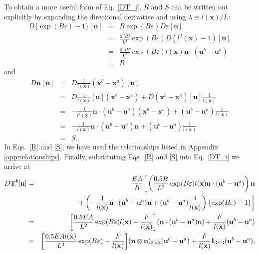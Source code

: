 \documentclass[12pt,aps,pre]{revtex4}
\begin{document}
To obtain a more useful form of Eq.\ \eqref{DT_i}, $R$ and $S$ can be written out explicitly by expanding the directional derivative and using $\lambda \equiv l(\textbf{x})/L$:
%
\begin{eqnarray}
D \{ \exp(B \varepsilon) - 1\} [\textbf{u}] &=& B \exp(B \varepsilon) D \varepsilon [\textbf{u}] \nonumber\\
&=& \frac{0.5B}{L^2} \exp(B \varepsilon)  D( l^2(\textbf{x}) - 1) [\textbf{u}] \nonumber\\
&=&  \frac{0.5B}{L^2}\exp(B \varepsilon)   l(\textbf{x})\textbf{n} \cdot (\textbf{u}^b - \textbf{u}^a) \nonumber\\
&=& R
\label{R}
\end{eqnarray}
%
and
%
\begin{eqnarray}
D \textbf{n} [\textbf{u}]  &=& D \frac{1}{l(\textbf{x})}(\textbf{x}^b - \textbf{x}^a) [\textbf{u}] \nonumber\\
&=& D \frac{1}{l(\textbf{x})} [\textbf{u}](\textbf{x}^b - \textbf{x}^a) + D (\textbf{x}^b - \textbf{x}^a) [\textbf{u}] \frac{1}{l(\textbf{x})} \nonumber\\
&=& -\frac{1}{l^{2}(\textbf{x})}\textbf{n} \cdot (\textbf{u}^b - \textbf{u}^a)(\textbf{x}^b - \textbf{x}^a) + (\textbf{u}^b - \textbf{u}^a)  \frac{1}{l(\textbf{x})} \nonumber\\
&=& -\frac{1}{l(\textbf{x})}\textbf{n} \cdot (\textbf{u}^b - \textbf{u}^a)\textbf{n} + (\textbf{u}^b - \textbf{u}^a)  \frac{1}{l(\textbf{x})} \nonumber\\
&=& S.
\label{S}
\end{eqnarray}
%
In Eqs.\ \eqref{R} and \eqref{S}, we have used the relationships listed in Appendix \ref{app:relationships}. Finally, substituting Eqs.\ \eqref{R} and \eqref{S} into Eq.\ \eqref{DT_i} we arrive at
%
\begin{eqnarray}
D\textbf{T}^b [\textbf{u}] &=& \frac{E A}{B} \bigg[ \left(\frac{0.5B }{L^2} \exp(B \varepsilon) l(\textbf{x})\textbf{n} \cdot (\textbf{u}^b - \textbf{u}^a) \right)\textbf{n} \nonumber\\
&& + \left( -\frac{1}{l(\textbf{x})}\textbf{n} \cdot (\textbf{u}^b - \textbf{u}^a)\textbf{n} + (\textbf{u}^b - \textbf{u}^a)  \frac{1}{l(\textbf{x})} \right) \{ \exp(B \varepsilon) - 1 \} \bigg] \nonumber\\
&=& \bigg[ \frac{0.5E A }{L^2} \exp(B \varepsilon)  l(\textbf{x})-\frac{F}{l(\textbf{x})} \bigg] (\textbf{n} \cdot (\textbf{u}^b - \textbf{u}^a)\textbf{n}) + \frac{F}{l(\textbf{x})} (\textbf{u}^b - \textbf{u}^a) \nonumber\\
&=& \bigg[ \frac{0.5E A  l(\textbf{x})}{L^2} \exp(B \varepsilon) -\frac{F}{l(\textbf{x})} \bigg] (\textbf{n} \otimes \textbf{n})_{3\times3}(\textbf{u}^b - \textbf{u}^a) + \frac{F}{l(\textbf{x})} \text{\textbf{I}}_{3\times3} (\textbf{u}^b - \textbf{u}^a) , \nonumber\\
\label{DTi_final}
\end{eqnarray}
\end{document}
